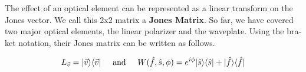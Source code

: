 \documentclass{article}
\DeclarePairedDelimiter\bra{\langle}{\rvert}
\DeclarePairedDelimiter\ket{\lvert}{\rangle}
\newcommand{\textAnd}{
    {
        \hspace{5mm}
        \textrm{and}
        \hspace{5mm}
    }
}
\newcommand{\Ixp}[1]{
    {
        e^{i#1}
    }
}
\begin{document}
The effect of an optical element can be represented as a linear transform 
on the Jones vector. We call this 2x2 matrix a \textbf{Jones Matrix}. 
So far, we have covered two major optical elements, the 
linear polarizer and the waveplate. Using the bra-ket notation, 
their Jones matrix can be written as follows. 

\[
    L_{\vec v} = \ket {\vec v} \bra{ \vec v}
    \textAnd 
    W(\hat f, \hat s, \phi) = \Ixp{\phi} \ket {\hat s} \bra{ \hat s} + \ket {\hat f} \bra{ \hat f}
\]
\end{document}

